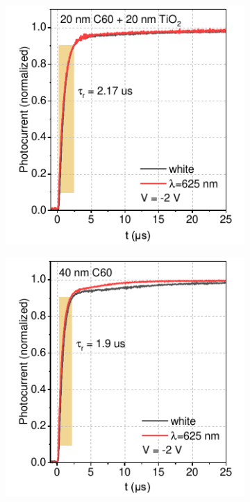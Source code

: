 \begin{figure}[t]
\begin{subfigure}[t]{0.24\textwidth}
        \caption{}
        \label{}
    \end{subfigure} 
    \begin{subfigure}[t]{0.24\textwidth}
        \centering
        \includegraphics[width=\textwidth]{chapters/transport_layers/images/Rise_time_20_20.pdf} %
        \caption{}
        \label{}
    \end{subfigure}
    \hfill
    \begin{subfigure}[t]{0.24\textwidth}
        \centering
        \includegraphics[width=\textwidth]{chapters/transport_layers/images/Rise_time_40C60.pdf} %

\end{subfigure}
\end{figure}
